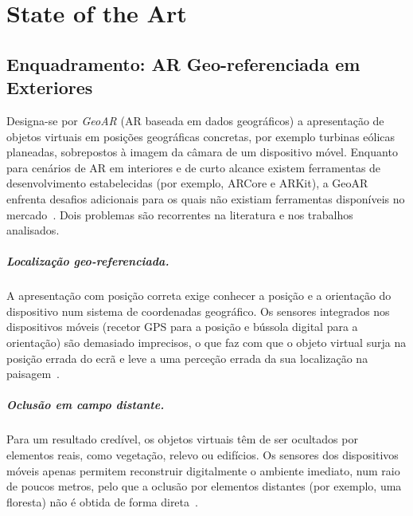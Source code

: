 \chapter{State of the Art}
\label{chap:state_of_the_art}

\begin{introduction}

\end{introduction}

\section{Enquadramento: AR Geo-referenciada em Exteriores}
\label{sec:sota_enquadramento}

Designa-se por \textit{GeoAR} (AR baseada em dados geográficos) a apresentação de objetos virtuais em posições geográficas concretas, por exemplo turbinas eólicas planeadas, sobrepostos à imagem da câmara de um dispositivo móvel. Enquanto para cenários de AR em interiores e de curto alcance existem ferramentas de desenvolvimento estabelecidas (por exemplo, ARCore e ARKit), a GeoAR enfrenta desafios adicionais para os quais não existiam ferramentas disponíveis no mercado~\cite[Sec.~2.2.2.1]{ar4wind2023}. Dois problemas são recorrentes na literatura e nos trabalhos analisados.

\paragraph{Localização geo-referenciada.} A apresentação com posição correta exige conhecer a posição e a orientação do dispositivo num sistema de coordenadas geográfico. Os sensores integrados nos dispositivos móveis (recetor GPS para a posição e bússola digital para a orientação) são demasiado imprecisos, o que faz com que o objeto virtual surja na posição errada do ecrã e leve a uma perceção errada da sua localização na paisagem~\cite[Sec.~1.2 e 2.2.2.1]{ar4wind2023}.

\paragraph{Oclusão em campo distante.} Para um resultado credível, os objetos virtuais têm de ser ocultados por elementos reais, como vegetação, relevo ou edifícios. Os sensores dos dispositivos móveis apenas permitem reconstruir digitalmente o ambiente imediato, num raio de poucos metros, pelo que a oclusão por elementos distantes (por exemplo, uma floresta) não é obtida de forma direta~\cite[Sec.~2.2.2.1]{ar4wind2023}.

